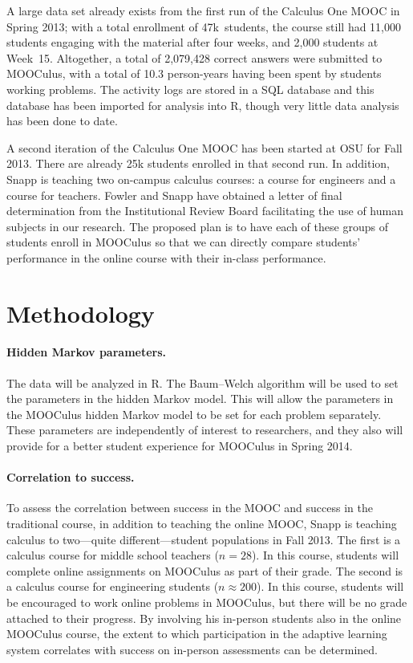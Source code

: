 \documentclass[12pt]{article}
\begin{document}
A large data set already exists from the first run of the Calculus One
MOOC in Spring 2013; with a total enrollment of 47k~students, the
course still had 11,000 students engaging with the material after four
weeks, and 2,000 students at Week~15.  Altogether, a total of
2,079,428 correct answers were submitted to MOOCulus, with a total of
10.3 person-years having been spent by students working problems.  The
activity logs are stored in a SQL database and this database has been
imported for analysis into R, though very little data analysis has
been done to date.

A second iteration of the Calculus One MOOC has been started at OSU
for Fall 2013.  There are already 25k students enrolled in that second
run.  In addition, Snapp is teaching two on-campus calculus courses: a
course for engineers and a course for teachers.  Fowler and Snapp have
obtained a letter of final determination from the Institutional Review
Board facilitating the use of human subjects in our research.  The
proposed plan is to have each of these groups of students enroll in
MOOCulus so that we can directly compare students' performance in the
online course with their in-class performance.

\section{Methodology}

\paragraph{Hidden Markov parameters.}

The data will be analyzed in R.  The Baum--Welch algorithm will be
used to set the parameters in the hidden Markov model. This will allow
the parameters in the MOOCulus hidden Markov model to be set for each
problem separately.  These parameters are independently of interest to
researchers, and they also will provide for a better student
experience for MOOCulus in Spring 2014.  

\paragraph{Correlation to success.}

To assess the correlation between success in the MOOC and success in
the traditional course, in addition to teaching the online MOOC, Snapp
is teaching calculus to two---quite different---student populations in
Fall 2013.  The first is a calculus course for middle school teachers
($n=28$). In this course, students will complete online assignments on
MOOCulus as part of their grade.  The second is a calculus course for
engineering students ($n\approx 200$).  In this course, students will
be encouraged to work online problems in MOOCulus, but there will be
no grade attached to their progress.  By involving his in-person
students also in the online MOOCulus course, the extent to which
participation in the adaptive learning system correlates with success
on in-person assessments can be determined.
\end{document}
